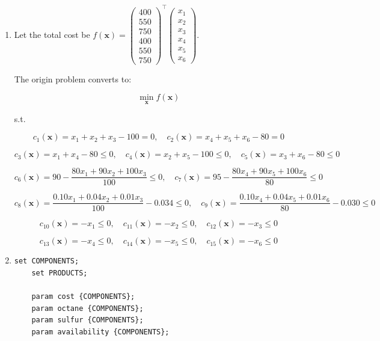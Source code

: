 \documentclass[10pt,a4paper]{article}
\begin{document}
\begin{enumerate}
    \item[1. ]
    Let the total cost be $f(\mathbf{x}) = \begin{pmatrix} 400 \\ 550 \\ 750 \\ 400 \\ 550 \\ 750 \end{pmatrix}^\top \begin{pmatrix} x_1 \\ x_2 \\ x_3 \\ x_4 \\ x_5 \\ x_6 \end{pmatrix}$.

    The origin problem converts to:

    $$
    \min_{\mathbf{x}} f(\mathbf{x})
    $$

    s.t.
    
    $$
    c_1(\mathbf{x}) = x_1 + x_2 + x_3 - 100 = 0
    ,\quad
    c_2(\mathbf{x}) = x_4 + x_5 + x_6 - 80 = 0
    $$

    $$
    c_3(\mathbf{x}) = x_1 + x_4 - 80 \leq 0
    ,\quad
    c_4(\mathbf{x}) = x_2 + x_5 - 100 \leq 0
    ,\quad
    c_5(\mathbf{x}) = x_3 + x_6 - 80 \leq 0
    $$

    $$
    c_6(\mathbf{x}) = 90 - \frac{80x_1 + 90x_2 + 100x_3}{100} \leq 0
    ,\quad
    c_7(\mathbf{x}) = 95 - \frac{80x_4 + 90x_5 + 100x_6}{80} \leq 0
    $$

    $$
    c_8(\mathbf{x}) = \frac{0.10x_1 + 0.04x_2 + 0.01x_3}{100} - 0.034 \leq 0
    ,\quad
    c_9(\mathbf{x}) = \frac{0.10x_4 + 0.04x_5 + 0.01x_6}{80} - 0.030 \leq 0
    $$

    $$
    c_{10}(\mathbf{x}) = -x_1 \leq 0
    ,\quad
    c_{11}(\mathbf{x}) = -x_2 \leq 0
    ,\quad
    c_{12}(\mathbf{x}) = -x_3 \leq 0
    $$

    $$
    c_{13}(\mathbf{x}) = -x_4 \leq 0
    ,\quad
    c_{14}(\mathbf{x}) = -x_5 \leq 0
    ,\quad
    c_{15}(\mathbf{x}) = -x_6 \leq 0
    $$

    \item[2. ]
    \begin{lstlisting}[caption=AMPL Code Block]
    set COMPONENTS;
    set PRODUCTS;

    param cost {COMPONENTS};
    param octane {COMPONENTS};
    param sulfur {COMPONENTS};
    param availability {COMPONENTS};


\end{lstlisting}
\end{enumerate}
\end{document}
